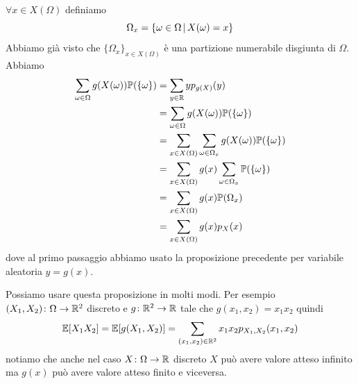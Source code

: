 \documentclass[a4paper]{article}
\begin{document}
\begin{snippetproof}{}
    \(\forall x \in X(\Omega)\) definiamo
    \[
        \Omega_x = \{
            \omega \in \Omega \,|\, X(\omega) = x
        \}
    \]
    Abbiamo già visto che \(\{\Omega_x\}_{x\in X(\Omega)}\)
    è una partizione numerabile disgiunta di \(\Omega\). Abbiamo
    \begin{align*}
        \sum_{\omega \in \Omega} g(X(\omega)) \mathbb P(\{\omega\})
        &= \sum_{y \in \mathbb{R}} y p_{g(X)}(y) \\
        &= \sum_{\omega \in \Omega} g(X(\omega)) \mathbb P(\{\omega\}) \\
        &= \sum_{x\in X(\Omega)} \sum_{\omega \in \Omega_x} g(X(\omega)) \mathbb P(\{\omega\}) \\
        &= \sum_{x\in X(\Omega)} g(x) \sum_{\omega \in \Omega_x} \mathbb P(\{\omega\}) \\
        &= \sum_{x\in X(\Omega)} g(x) \mathbb P(\Omega_x) \\
        &= \sum_{x\in X(\Omega)} g(x) p_X(x)
    \end{align*}
    dove al primo passaggio abbiamo usato la proposizione precedente %
    per variabile aleatoria \(y = g(x)\).
\end{snippetproof}

Possiamo usare questa proposizione in molti modi. Per esempio \((X_1, X_2) \colon \Omega \to \mathbb{R}^2\)
discreto e \(g \colon \mathbb{R}^2 \to \mathbb{R}\) tale che \(g(x_1, x_2) = x_1x_2\)
quindi
\begin{align*}
    \mathbb E[X_1X_2] = \mathbb E[g(X_1, X_2)]
    = \sum_{(x_1, x_2) \in \mathbb{R}^2} x_1x_2 p_{X_1, X_2}(x_1, x_2)
\end{align*}
notiamo che anche nel caso \(X \colon \Omega \to \mathbb{R}\)
discreto \(X\) può avere valore atteso infinito ma \(g(x)\)
può avere valore atteso finito e viceversa.
\end{document}
